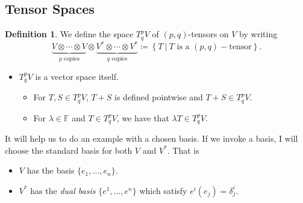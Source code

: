 \documentclass[12pt]{article}
\newcommand{\field}{\mathbb{F}}
\newcommand{\tspace}{T_q^pV}
\theoremstyle{definition}
\newtheorem{definition}{Definition}[section]
\begin{document}
\subsection{Tensor Spaces}
\begin{definition}
We define the space $T^p_q V$ of $(p,q)$-tensors on $V$ by writing
\[
\underbrace{V\otimes \cdots \otimes V}_{\textrm{$p$ copies}} \otimes \underbrace{V^*\otimes \cdots \otimes V^*}_{\textrm{$q$ copies}} \coloneqq \left\{ T ~\vert~ \textrm{$T$ is a $(p,q)-$tensor}\right\}.
\]
\begin{itemize}
    \item $T_q^pV$ is a vector space itself.
    \begin{itemize}
        \item For $T,S \in T_q^pV$, $T+S$ is defined pointwise and $T+S\in T_q^pV$.
        \item For $\lambda \in \field$ and $T\in \tspace$, we have that $\lambda T \in \tspace$.
    \end{itemize}
\end{itemize}
\end{definition}

It will help us to do an example with a chosen basis.  If we invoke a basis, I will choose the standard basis for both $V$ and $V^*$.  That is
\begin{itemize}
    \item $V$ has the basis $\{e_1,\dots,e_n\}$.
    \item $V^*$ has the \emph{dual basis} $\{e^1,\dots,e^n\}$ which satisfy $e^i(e_j)=\delta^i_j$.
\end{itemize}
\end{document}

